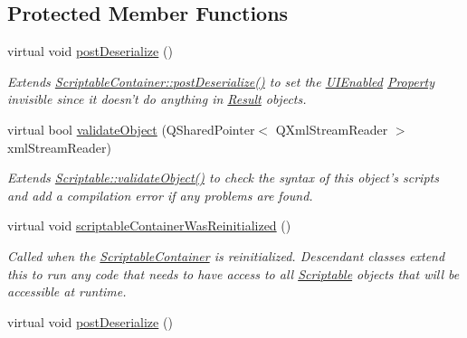 \subsection*{Protected Member Functions}
\begin{DoxyCompactItemize}
\item 
\hypertarget{class_picto_1_1_control_target_result_a46d36f8cd048d2ffbfcbb99308c9e5cd}{virtual void \hyperlink{class_picto_1_1_control_target_result_a46d36f8cd048d2ffbfcbb99308c9e5cd}{post\-Deserialize} ()}\label{class_picto_1_1_control_target_result_a46d36f8cd048d2ffbfcbb99308c9e5cd}

\begin{DoxyCompactList}\small\item\em Extends \hyperlink{class_picto_1_1_scriptable_container_a0654af2c08f9a6c967a21b57614950ba}{Scriptable\-Container\-::post\-Deserialize()} to set the \hyperlink{class_picto_1_1_u_i_enabled}{U\-I\-Enabled} \hyperlink{class_picto_1_1_property}{Property} invisible since it doesn't do anything in \hyperlink{class_picto_1_1_result}{Result} objects. \end{DoxyCompactList}\item 
virtual bool \hyperlink{class_picto_1_1_control_target_result_ab9de740ffbe40f637b60b76bf3b71ad9}{validate\-Object} (Q\-Shared\-Pointer$<$ Q\-Xml\-Stream\-Reader $>$ xml\-Stream\-Reader)
\begin{DoxyCompactList}\small\item\em Extends \hyperlink{class_picto_1_1_scriptable_ab6e2944c43a3b5d418bf7b251594386d}{Scriptable\-::validate\-Object()} to check the syntax of this object's scripts and add a compilation error if any problems are found. \end{DoxyCompactList}\item 
virtual void \hyperlink{class_picto_1_1_control_target_result_a6629c67f66c4f4e1290a9994f414ee8e}{scriptable\-Container\-Was\-Reinitialized} ()
\begin{DoxyCompactList}\small\item\em Called when the \hyperlink{class_picto_1_1_scriptable_container}{Scriptable\-Container} is reinitialized. Descendant classes extend this to run any code that needs to have access to all \hyperlink{class_picto_1_1_scriptable}{Scriptable} objects that will be accessible at runtime. \end{DoxyCompactList}\item 
\hypertarget{class_picto_1_1_control_target_result_aaa7e33f8afbc169c652a1aba180a968e}{virtual void \hyperlink{class_picto_1_1_control_target_result_aaa7e33f8afbc169c652a1aba180a968e}{post\-Deserialize} ()}\label{class_picto_1_1_control_target_result_aaa7e33f8afbc169c652a1aba180a968e}


\end{DoxyCompactItemize}

